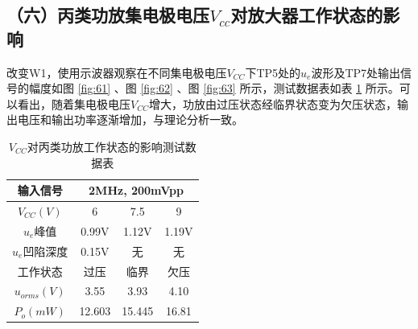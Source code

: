 \documentclass[UTF8]{ctexart}
\begin{document}
\subsection*{（六）丙类功放集电极电压\texorpdfstring{$V_{cc}$}{}对放大器工作状态的影响}
改变W1，使用示波器观察在不同集电极电压$V_{CC}$下TP5处的$u_e$波形及TP7处输出信号的幅度如图 \ref{fig:61} 、图 \ref{fig:62} 、图 \ref{fig:63} 所示，测试数据表如表 \ref{table:6.1} 所示。可以看出，随着集电极电压$V_{CC}$增大，功放由过压状态经临界状态变为欠压状态，输出电压和输出功率逐渐增加，与理论分析一致。
\begin{table}[H]
    \centering
    \caption{$V_{CC}$对丙类功放工作状态的影响测试数据表}
    \label{table:6.1}
    \begin{tabular}{c|ccc}
    \hline
    输入信号          & \multicolumn{3}{c}{2MHz, 200mVpp}                \\ \hline
    $V_{CC}(V)$   & \multicolumn{1}{c|}{6} & \multicolumn{1}{c|}{7.5} & 9 \\ \hline
    $u_e$峰值       & \multicolumn{1}{c|}{0.99V} & \multicolumn{1}{c|}{1.12V} & 1.19V \\ \hline
    $u_e$凹陷深度     & \multicolumn{1}{c|}{0.15V} & \multicolumn{1}{c|}{无} & 无 \\ \hline
    工作状态          & \multicolumn{1}{c|}{过压} & \multicolumn{1}{c|}{临界} & 欠压 \\ \hline
    $u_{orms}(V)$ & \multicolumn{1}{c|}{3.55} & \multicolumn{1}{c|}{3.93} & 4.10 \\ \hline
    $P_o(mW)$     & \multicolumn{1}{c|}{12.603} & \multicolumn{1}{c|}{15.445} &  16.81\\ \hline
    \end{tabular}
\end{table}
\end{document}
